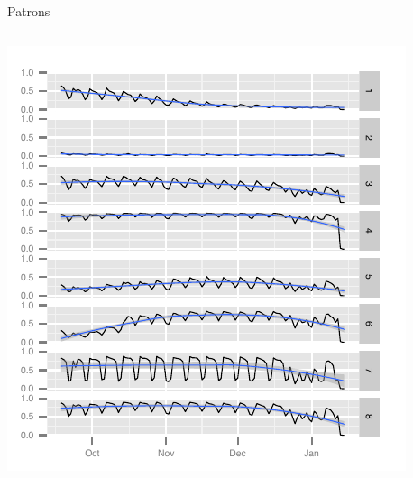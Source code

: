 \documentclass[xcolor=x11names,
								compress,
								aspectratio=1610]{beamer}
\theoremstyle{definition}%
\renewcommand{\(}{\begin{columns}}
\renewcommand{\)}{\end{columns}}
\newcommand{\<}[1]{\begin{column}{#1}}
\renewcommand{\>}{\end{column}}
\begin{document}
\begin{frame}{Patrons}
\begin{columns}[onlytextwidth]
\begin{column}{.5\textwidth}
\begin{center}
		\includegraphics{presence_8_clust_pres}
		\end{center}	
		\end{column}
	\end{columns}
\end{frame}
\end{document}
